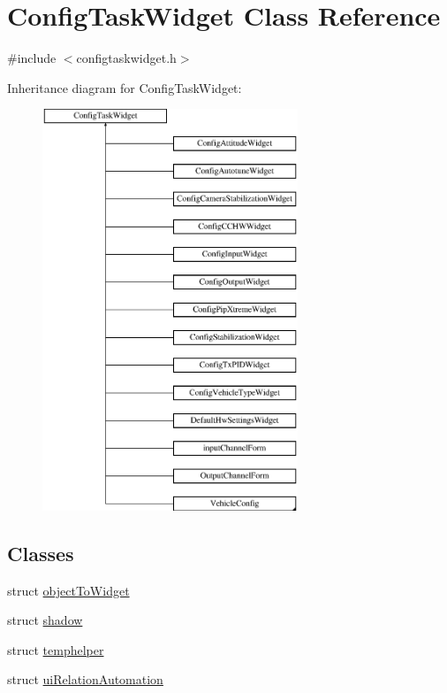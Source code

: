 \hypertarget{class_config_task_widget}{\section{\-Config\-Task\-Widget \-Class \-Reference}
\label{class_config_task_widget}
}


{\ttfamily \#include $<$configtaskwidget.\-h$>$}

\-Inheritance diagram for \-Config\-Task\-Widget\-:\begin{figure}[H]
\begin{center}
\leavevmode
\includegraphics[height=12.000000cm]{class_config_task_widget}
\end{center}
\end{figure}
\subsection*{\-Classes}
\begin{DoxyCompactItemize}
\item 
struct \hyperlink{struct_config_task_widget_1_1object_to_widget}{object\-To\-Widget}
\item 
struct \hyperlink{struct_config_task_widget_1_1shadow}{shadow}
\item 
struct \hyperlink{struct_config_task_widget_1_1temphelper}{temphelper}
\item 
struct \hyperlink{struct_config_task_widget_1_1ui_relation_automation}{ui\-Relation\-Automation}
\end{DoxyCompactItemize}
